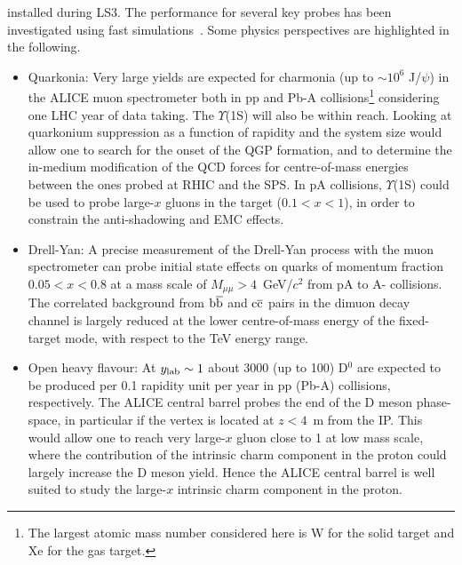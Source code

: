 \documentclass[../report.tex]{subfiles}
\begin{document}
installed during LS3. The performance for several key probes has been investigated using fast simulations~\cite{Hadjidakis:2018ifr}. Some physics perspectives are highlighted in the following.
\begin{itemize}
\item{Quarkonia: Very large yields are expected for charmonia (up to $\sim 10^{6}$ J/$\psi$) in the ALICE muon spectrometer both in pp and Pb-A collisions\footnote{The largest atomic mass number considered here is W for the solid target and Xe for the gas target.} considering one LHC year of data taking. The $\Upsilon$(1S) will also be within reach. Looking at quarkonium suppression as a function of rapidity and the system size would allow one to search for the onset of the QGP formation, and to determine the in-medium modification of the QCD forces for centre-of-mass energies between the ones probed at RHIC and the SPS. In pA collisions, $\Upsilon$(1S) could be used to probe large-$x$ gluons in the target ($0.1<x<1$), in order to constrain the anti-shadowing and EMC effects.}

\item{Drell-Yan: A precise measurement of the Drell-Yan process with the muon spectrometer can probe initial state effects on quarks of momentum fraction $0.05<x<0.8$ at a mass scale of $M_{\mu\mu}> 4$~GeV/$c^2$ from pA to A- collisions. The correlated background from $\rm b\overline{b}$ and $\rm c\overline{c}$ pairs in the dimuon decay channel is largely reduced at the lower centre-of-mass energy of the fixed-target mode, with respect to the TeV energy range.}

\item{Open heavy flavour: At $y_{\rm lab} \sim 1$ about 3000 (up to 100) D$^{0}$ are expected to be produced per 0.1 rapidity unit per year in pp (Pb-A) collisions, respectively. The ALICE central barrel probes the end of the D meson phase-space, in particular if the vertex is located at $z < 4$~m from the IP. This would allow one to reach very large-$x$ gluon close to 1 at low mass scale, where the contribution of the intrinsic charm component in the proton could largely increase the D meson yield. Hence the ALICE central barrel is well suited to study the large-$x$ intrinsic charm component in the proton.}


\end{itemize}
\end{document}
